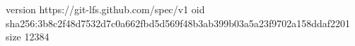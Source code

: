 version https://git-lfs.github.com/spec/v1
oid sha256:3b8c2f48d7532d7c0a662fbd5d569f48b3ab399b03a5a23f9702a158ddaf2201
size 12384
